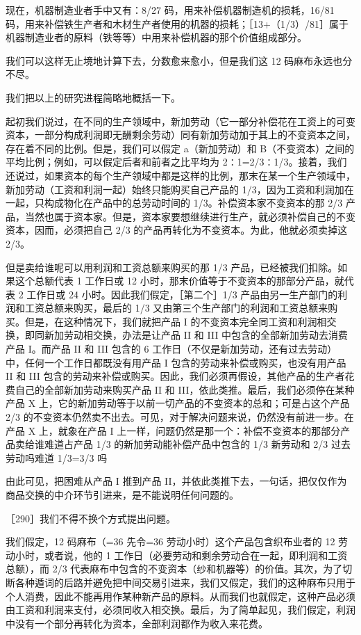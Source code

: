 现在，机器制造业者手中又有：8/27 码，用来补偿机器制造机的损耗，16/81 码，用来补偿铁生产者和木材生产者使用的机器的损耗；［13+（1/3）/81］属于机器制造业者的原料（铁等等）中用来补偿机器的那个价值组成部分。

我们可以这样无止境地计算下去，分数愈来愈小，但是我们这 12 码麻布永远也分不尽。

我们把以上的研究进程简略地概括一下。

起初我们说过，在不同的生产领域中，新加劳动（它一部分补偿花在工资上的可变资本，一部分构成利润即无酬剩余劳动）同有新加劳动加于其上的不变资本之间，存在着不同的比例。但是，我们可以假定 a（新加劳动）和 B（不变资本）之间的平均比例；例如，可以假定后者和前者之比平均为 2∶1=2/3∶1/3。接着，我们还说过，如果资本的每个生产领域中都是这样的比例，那末在某一个生产领域中，新加劳动（工资和利润一起）始终只能购买自己产品的 1/3，因为工资和利润加在一起，只构成物化在产品中的总劳动时间的 1/3。补偿资本家不变资本的那 2/3 产品，当然也属于资本家。但是，资本家要想继续进行生产，就必须补偿自己的不变资本，因而，必须把自己 2/3 的产品再转化为不变资本。为此，他就必须卖掉这 2/3。

但是卖给谁呢可以用利润和工资总额来购买的那 1/3 产品，已经被我们扣除。如果这个总额代表 1 工作日或 12 小时，那末价值等于不变资本的那部分产品，就代表 2 工作日或 24 小时。因此我们假定，［第二个］1/3 产品由另一生产部门的利润和工资总额来购买，最后的 1/3 又由第三个生产部门的利润和工资总额来购买。但是，在这种情况下，我们就把产品 I 的不变资本完全同工资和利润相交换，即同新加劳动相交换，办法是让产品 II 和 III 中包含的全部新加劳动去消费产品 I。而产品 II 和 III 包含的 6 工作日（不仅是新加劳动，还有过去劳动）中，任何一个工作日都既没有用产品 I 包含的劳动来补偿或购买，也没有用产品 II 和 III 包含的劳动来补偿或购买。因此，我们必须再假设，其他产品的生产者花费自己的全部新加劳动来购买产品 II 和 III，依此类推。最后，我们必须停在某种产品 X 上，它的新加劳动等于以前一切产品的不变资本的总和；可是占这个产品 2/3 的不变资本仍然卖不出去。可见，对于解决问题来说，仍然没有前进一步。在产品 X 上，就象在产品 I 上一样，问题仍然是那一个：补偿不变资本的那部分产品卖给谁难道占产品 1/3 的新加劳动能补偿产品中包含的 1/3 新劳动和 2/3 过去劳动吗难道 1/3=3/3 吗

由此可见，把困难从产品 I 推到产品 II，并依此类推下去，一句话，把仅仅作为商品交换的中介环节引进来，是不能说明任何问题的。

［290］我们不得不换个方式提出问题。

我们假定，12 码麻布（=36 先令=36 劳动小时）这个产品包含织布业者的 12 劳动小时，或者说，他的 1 工作日（必要劳动和剩余劳动合在一起，即利润和工资总额），而 2/3 代表麻布中包含的不变资本（纱和机器等）的价值。其次，为了切断各种遁词的后路并避免把中间交易引进来，我们又假定，我们的这种麻布只用于个人消费，因此不能再用作某种新产品的原料。从而我们也就假定，这种产品必须由工资和利润来支付，必须同收入相交换。最后，为了简单起见，我们假定，利润中没有一个部分再转化为资本，全部利润都作为收入来花费。


